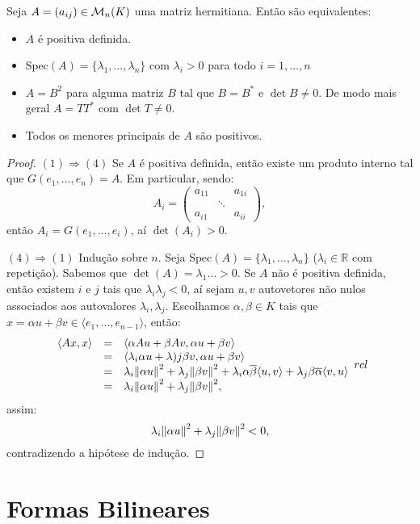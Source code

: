 \documentclass[11pt,twoside,a4paper]{book}
\begin{document}
\begin{teorema}
Seja $A=(a_{ij})\in\mathcal{M}_{n}(K)$ uma matriz hermitiana. Então são equivalentes:
\begin{itemize}
\item $A$ é positiva definida.
\item $\mathrm{Spec}(A)=\{\lambda_1,\dots,\lambda_n\}$ com $\lambda_i>0$ para todo $i=1,\dots,n$
\item $A=B^2$ para alguma matriz $B$ tal que $B=B^*$ e $\det B\neq 0$. De modo mais geral $A=TT^*$ com $\det T\neq 0$.
\item Todos os menores principais de $A$ são positivos.
\end{itemize}
\end{teorema}
\begin{proof}
$(1)\Rightarrow(4)$ Se $A$ é positiva definida, então existe um produto interno tal que $G(e_1,\dots,e_n)=A$. Em particular, sendo:
\[
A_i=\begin{pmatrix}
a_{11}&&a_{1i}\\&\ddots&\\a_{i1}&&a_{ii}
\end{pmatrix},
\]
então $A_i=G(e_1,\dots,e_i)$, aí $\det(A_i)>0$.

\medskip
\noindent
$(4)\Rightarrow(1)$ Indução sobre $n$. Seja $\mathrm{Spec}(A)=\{\lambda_1,\dots,\lambda_n\}$ ($\lambda_i\in\mathbb{R}$ com repetição). Sabemos que $\det(A)=\lambda_1\dots>0$. Se $A$ não é positiva definida, então existem $i$ e $j$ tais que $\lambda_i\lambda_j<0$, aí sejam $u,v$ autovetores não nulos associados aos autovalores $\lambda_i,\lambda_j$. Escolhamos $\alpha,\beta\in K$ tais que $x=\alpha u+\beta v\in\langle e_1,\dots,e_{n-1}\rangle$, então:
\[
\begin{array}{rcl}
\langle Ax,x\rangle&=&\langle \alpha Au+\beta Av,\alpha u+\beta v\rangle\\
&=&\langle \lambda_i\alpha u+\lambda)j\beta v,\alpha u+\beta v\rangle\\
&=&\lambda_i\norm{\alpha u}^2+\lambda_j\norm{\beta v}^2+\lambda_i\alpha\overline{\beta}\langle u,v\rangle+\lambda_j\beta\overline{\alpha}\langle v,u\rangle\\
&=&\lambda_i\norm{\alpha u}^2+\lambda_j\norm{\beta v}^2,
\end{array}{rcl}
\]
assim:
\[
\lambda_i\norm{\alpha u}^2+\lambda_j\norm{\beta v}^2<0,
\]
contradizendo a hipótese de indução.
\end{proof}

\chapter{Formas Bilineares}
\end{document}
